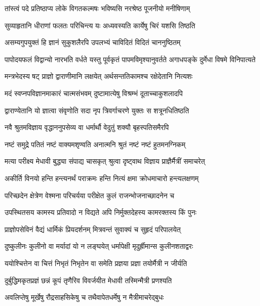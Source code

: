 \twolineshloka
{तांस्त्वं पदे प्रतिष्ठाप्य लोके विगतकल्मषः}
{भविष्यसि नरश्रेष्ठ पूजनीयो मनीषिणाम्}


\twolineshloka
{सुव्याहृतानि धीराणां फलतः परिचिन्त्य यः}
{अध्यवस्यति कार्येषु चिरं यशसि तिष्ठति}


\twolineshloka
{असम्यगुपयुक्तं हि ज्ञानं सुकुशलैरपि}
{उपलभ्यं चाविदितं विदितं चाननुष्ठितम्}


पापोदयफलं विद्वान्यो नारभति वर्धते
\twolineshloka
{यस्तु पूर्वकृतं पापमविमृश्यानुवर्तते}
{अगाधपङ्के दुर्मेधा विषमे विनिपात्यते}


\twolineshloka
{मन्त्रभेदस्य षट् प्राज्ञो द्वाराणीमानि लक्षयेत्}
{अर्थसन्ततिकामश्च रक्षेदेतानि नित्यशः}


\twolineshloka
{मदं स्वप्नपविज्ञानमाकारं चात्मसंभवम्}
{दुष्टामात्येषु विश्रम्भं दूताच्चाकुशलादपि}


\twolineshloka
{द्वाराण्येतानि यो ज्ञात्वा संवृणोति सदा नृप}
{त्रिवर्गाचरणे युक्तः स शत्रूनधितिष्ठति}


\twolineshloka
{नवै श्रुतमविज्ञाय वृद्धाननुपसेव्य वा}
{धर्मार्थौ वेदुतुं शक्यौ बृहस्पतिसमैरपि}


\twolineshloka
{नष्टं समुद्रे पतितं नष्टं वाक्यमशृण्वति}
{अनात्मनि श्रुतं नष्टं नष्टं हुतमनग्निकम्}


\twolineshloka
{मत्या परीक्ष्य मेधावी बुद्ध्या संपाद्य चासकृत्}
{श्रुत्वा दृष्ट्वाथ विज्ञाय प्राज्ञैर्मैत्रीं समाचरेत्}


\twolineshloka
{अकीर्ति विनयो हन्ति हन्त्यनर्थं पराक्रमः}
{हन्ति नित्यं क्षमा क्रोधमाचारो हन्त्यलक्षणम्}


\twolineshloka
{परिच्छदेन क्षेत्रेण वेश्मना परिचर्यया}
{परीक्षेत कुलं राजन्भोजनाच्छादनेन च}


\twolineshloka
{उपस्थितसय कामस्य प्रतिवादो न विद्यते}
{अपि निर्मुक्तदेहस्य कामरक्तस्य किं पुनः}


\twolineshloka
{प्राज्ञोपसेविनं वैद्यं धार्मिकं प्रियदर्शनम्}
{मित्रवन्तं सुवाक्यं च सुहृदं परिपालयेत्}


\twolineshloka
{दुष्कुलीनः कुलीनो वा मर्यादां यो न लङ्घयेत्}
{धर्मापेक्षी मृदुर्ह्रीमान्स कुलीनशताद्वरः}


\twolineshloka
{ययोश्चित्तेन वा चित्तं निभृतं निभृतेन वा}
{समेति प्रज्ञया प्रज्ञा तयोर्मैत्री न जीर्यति}


\twolineshloka
{दुर्बुद्धिमकृतप्रज्ञं छन्नं कूपं तृणैरिव}
{विवर्जयीत मेधावी तस्मिन्मैत्री प्रणश्यति}


\twolineshloka
{अवलिप्तेषु मूर्खेषु रौद्रसाहसिकेषु च}
{तथैवापेतधर्मेषु न मैत्रीमाचरेद्बुधः}


